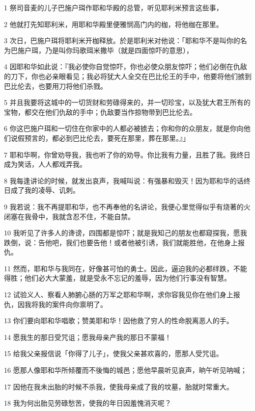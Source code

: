 \par 1 祭司音麦的儿子巴施户珥作耶和华殿的总管，听见耶利米预言这些事，
\par 2 他就打先知耶利米，用耶和华殿里便雅悯高门内的枷，将他枷在那里。
\par 3 次日，巴施户珥将耶利米开枷释放。於是耶利米对他说：「耶和华不是叫你的名为巴施户珥，乃是叫你玛歌珥米撒毕（就是四面惊吓的意思），
\par 4 因耶和华如此说：『我必使你自觉惊吓，你也必使众朋友惊吓；他们必倒在仇敌的刀下，你也必亲眼看见；我必将犹大人全交在巴比伦王的手中，他要将他们掳到巴比伦去，也要用刀将他们杀戮。
\par 5 并且我要将这城中的一切货财和劳碌得来的，并一切珍宝，以及犹大君王所有的宝物，都交在他们仇敌的手中；仇敌要当作掠物带到巴比伦去。
\par 6 你这巴施户珥和一切住在你家中的人都必被掳去；你和你的众朋友，就是你向他们说假预言的，都必到巴比伦去，要死在那里，葬在那里。』」
\par 7 耶和华啊，你曾劝导我，我也听了你的劝导。你比我有力量，且胜了我。我终日成为笑话，人人都戏弄我。
\par 8 我每逢讲论的时候，就发出哀声，我喊叫说：有强暴和毁灭！因为耶和华的话终日成了我的凌辱、讥刺。
\par 9 我若说：我不再提耶和华，也不再奉他的名讲论，我便心里觉得似乎有烧著的火闭塞在我骨中，我就含忍不住，不能自禁。
\par 10 我听见了许多人的谗谤，四围都是惊吓；就是我知己的朋友也都窥探我，愿我跌倒，说：告他吧，我们也要告他！或者他被引诱，我们就能胜他，在他身上报仇。
\par 11 然而，耶和华与我同在，好像甚可怕的勇士。因此，逼迫我的必都绊跌，不能得胜；他们必大大蒙羞，就是受永不忘记的羞辱，因为他们行事没有智慧。
\par 12 试验义人、察看人肺腑心肠的万军之耶和华啊，求你容我见你在他们身上报仇，因我将我的案件向你禀明了。
\par 13 你们要向耶和华唱歌；赞美耶和华！因他救了穷人的性命脱离恶人的手。
\par 14 愿我生的那日受咒诅；愿我母亲产我的那日不蒙福！
\par 15 给我父亲报信说「你得了儿子」，使我父亲甚欢喜的，愿那人受咒诅。
\par 16 愿那人像耶和华所倾覆而不後悔的城邑；愿他早晨听见哀声，晌午听见呐喊；
\par 17 因他在我未出胎的时候不杀我，使我母亲成了我的坟墓，胎就时常重大。
\par 18 我为何出胎见劳碌愁苦，使我的年日因羞愧消灭呢？

